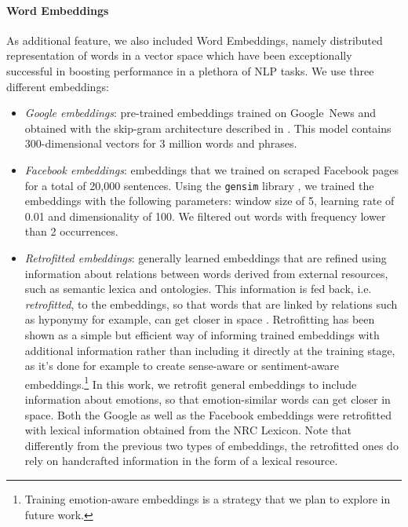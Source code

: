 \documentclass[11pt]{article}
\newcommand{\note}[1]{\textbf{*** #1 ***}}
\begin{document}
\paragraph{Word Embeddings}
As additional feature, we also included Word Embeddings, namely distributed representation of words in a vector space which have been exceptionally successful in boosting performance in a plethora of NLP tasks.%
We use three different embeddings: 

\begin{itemize} 

\item \textit{Google embeddings}: pre-trained embeddings trained on Google~News and obtained with the skip-gram architecture described in  \cite{mikolov2013distributed}. This model contains 300-dimensional vectors for 3 million words and phrases.

\item \textit{Facebook embeddings}: embeddings that we trained on scraped Facebook pages for a total of 20,000 sentences. Using the \texttt{gensim} library \cite{gensim}, we trained the embeddings with the following parameters: window size of 5, learning rate of 0.01 and dimensionality of 100. We filtered out words with frequency lower than 2 occurrences.

\item \textit{Retrofitted embeddings}: generally learned embeddings that are refined using information about relations between words derived from external resources, such as semantic lexica and ontologies. This information is fed back, i.e. \textit{retrofitted}, to the embeddings, so that words that are linked by relations such as hyponymy for example, can get closer in space \cite{retrofitting}. Retrofitting has been shown as a simple but efficient way of informing trained embeddings with additional information rather than including it directly at the training stage, as it's done for example to create sense-aware \cite{iacobacci2015sensembed} or sentiment-aware \cite{tang:14} embeddings.\footnote{Training emotion-aware embeddings is a strategy that we plan to explore in future work.} In this work, we retrofit general embeddings to include information about emotions, so that emotion-similar words can get closer in space. Both the Google as well as the Facebook embeddings were retrofitted with lexical information obtained from the NRC Lexicon. Note that differently from the previous two types of embeddings, the retrofitted ones do rely on handcrafted information in the form of a lexical resource.




\end{itemize}
\end{document}
